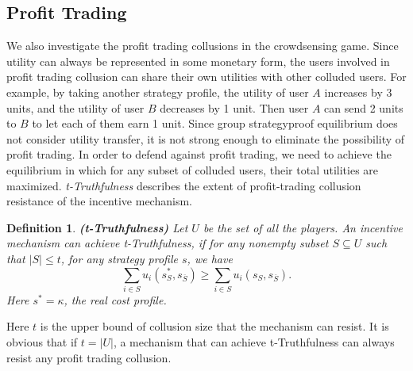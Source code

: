 \documentclass[conference]{IEEEtran}
\newtheorem{definition}{Definition}
\theoremstyle{definition}
\begin{document}
\subsection{Profit Trading}
\label{subsec:pt}
We also investigate the profit trading collusions in the crowdsensing game. Since utility can always be represented in some monetary form, the users involved in profit trading collusion can share their own utilities with other colluded users. For example, by taking another strategy profile, the utility of user $A$ increases by 3 units, and the utility of user $B$ decreases by 1 unit. Then user $A$ can send 2 units to $B$ to let each of them earn 1 unit. Since group strategyproof equilibrium does not consider utility transfer, 
it is not strong enough to eliminate the possibility of profit trading. In order to defend against profit trading, we need to achieve the equilibrium in which for any subset of colluded users, their total utilities are maximized. \emph{t-Truthfulness} \cite{goldberg2005collusion} describes the extent of profit-trading collusion resistance of the incentive mechanism.
\begin{definition}
\label{def:tt}
\textbf{(t-Truthfulness)} Let $U$ be the set of all the players. An incentive mechanism can achieve t-Truthfulness, if for any nonempty subset $S\subseteq U$ such that $|S|\leq t$, for any strategy profile $s$, we have
\begin{equation}
\sum_{i\in S} u_i(s_S^*,s_{\overline{S}})\geq \sum_{i\in S} u_i(s_S,s_{\overline{S}}).
\end{equation}
Here $s^*=\kappa$, the real cost profile.
\end{definition}
Here $t$ is the upper bound of collusion size that the mechanism can resist. It is obvious that if $t=|U|$, a mechanism that can achieve t-Truthfulness can always resist any profit trading collusion. 
\end{document}

